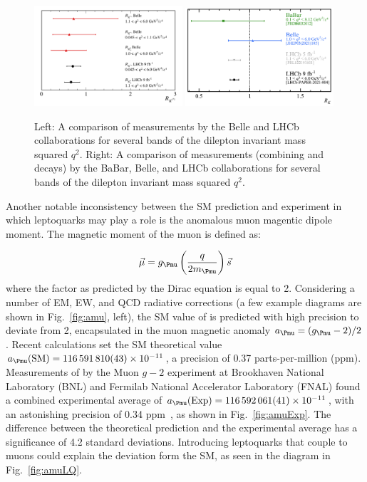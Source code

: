 \begin{figure}[H]
    \centering
    {\includegraphics[width=0.49\textwidth]{Images/Theory/LHCbBelle.png}}
    {\includegraphics[width=0.49\textwidth]{Images/Theory/RKmeasurements.png}}
    \caption{Left: A comparison of \Ratio{\PKstar} measurements by the Belle and LHCb collaborations for several bands of the dilepton invariant mass squared $q^2$. Right: A comparison of \Ratio{\PK} measurements (combining \HepProcess{\PBplus \to \PKplus\Pleptonplus\Pleptonminus} and \HepProcess{\PBzero \to \PKzero\Pleptonplus\Pleptonminus} decays) by the BaBar, Belle, and LHCb collaborations for several bands of the dilepton invariant mass squared $q^2$.}
    \label{fig:FlavorAnomalies}
\end{figure}


Another notable inconsistency between the SM prediction and experiment in which leptoquarks may play a role is the anomalous muon magentic dipole moment. The magnetic moment of the muon is defined as:

\begin{equation}
    \vec{\mu} = \gmuon\left(\frac{q}{2m_{\Pmu}}\right)\vec{s}
\end{equation}
where the factor \gmuon as predicted by the Dirac equation is equal to 2. Considering a number of EM, EW, and QCD radiative corrections (a few example diagrams are shown in Fig.~\ref{fig:amu}, left), the SM value of \gmuon is predicted with high precision to deviate from 2, encapsulated in the muon magnetic anomaly $\amuon = (\gmuon-2)/2$. Recent calculations set the SM theoretical value $\amuon(\mathrm{SM})=\num{116591810(43)e-11}$, a precision of 0.37 parts-per-million (ppm). Measurements of \amuon by the Muon $g-2$ experiment at Brookhaven National Laboratory (BNL) and Fermilab National Accelerator Laboratory (FNAL) found a combined experimental average of $\amuon(\mathrm{Exp}) = \num{116592061(41)e-11}$, with an astonishing precision of 0.34 ppm~\cite{Muongminus2}, as shown in Fig.~\ref{fig:amuExp}. The difference between the theoretical prediction and the experimental average has a significance of 4.2 standard deviations. Introducing leptoquarks that couple to muons could explain the deviation form the SM, as seen in the diagram in Fig.~\ref{fig:amuLQ}.

